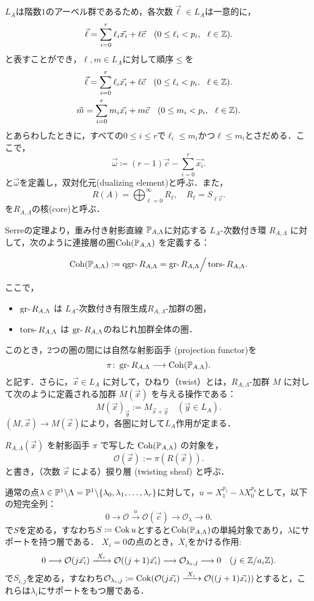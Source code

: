 $L_A$は階数$1$のアーベル群であるため，各次数$\vec{\ell}\in L_A$は一意的に，
\[\vec{\ell} = \sum_{i=0}^r \ell_i\vec{x_i} + \ell\vec{c}\quad (0\le \ell_i < p_i,\ \ \ell \in {\mathbb Z}).\]
と表すことができ，$\ell,m\in L_A$に対して順序$\le$を
\begin{gather*}
\vec{\ell} = \sum_{i=0}^r \ell_i\vec{x_i} + \ell\vec{c}\quad (0\le \ell_i < p_i,\ \ \ell \in \ZZ).\\
\vec{m} = \sum_{i=0}^r m_i\vec{x_i} + m\vec{c}\quad (0\le m_i < p_i,\ \ \ell \in \ZZ).
\end{gather*}
とあらわしたときに，すべての$0\le i\le r$で$\ell_i\le m_i$かつ$\ell\le m_i$とさだめる．ここで，
\[\vec{\omega} \coloneq (r-1)\vec{c} - \sum_{i=0}^r\vec{x_i}.\]
と$\vec{\omega}$を定義し，双対化元(dualizing element)と呼ぶ．また，
\[R(A)= \bigoplus_{\ell=0}^\infty R_{\ell},\quad R_\ell = S_{\ell\vec{c}}.\]
を$R_{A,\Lambda}$の核(core)と呼ぶ．

\begin{defn}\cite{GL87}
	Serreの定理より，重み付き射影直線 ${\mathbb P}_{A,\Lambda}$に対応する $L_A$-次数付き環 $R_{A,\Lambda}$ に対して，次のように連接層の圏$\operatorname{\mathrm{Coh}}({\mathbb P}_{A,\Lambda})$ を定義する：

\[
	\Coh(\PP_{A,\Lambda}) := \qgr R_{A,\Lambda} = \gr R_{A,\Lambda}\Big{/}\tors R_{A,\Lambda}.
\]

ここで，
\begin{itemize}
	\item $\gr R_{A,\Lambda}$ は $L_A$-次数付き有限生成$R_{A,\Lambda}$-加群の圏，
	\item $\tors R_{A,\Lambda}$ は $\gr R_{A,\Lambda}$のねじれ加群全体の圏．
\end{itemize}
このとき，2つの圏の間には自然な射影函手 (projection functor)を
\[ \pi\colon \gr R_{A,\Lambda} \longrightarrow \Coh(\PP_{A,\Lambda}) .\]
と記す．さらに，$\vec{x} \in L_A$ に対して，ひねり（twist）とは，$R_{A,\Lambda}$-加群 $M$ に対して次のように定義される加群 $M(\vec{x})$ を与える操作である：
\[
M(\vec{x})_{\vec{y}} := M_{\vec{x} + \vec{y}} \quad (\vec{y} \in L_A).
\]
$(M,\vec{x})\to M(\vec{x})$により，各圏に対して$L_A$作用が定まる．
\end{defn}
$R_{A,\Lambda}(\vec{x})$ を射影函手 $\pi$ で写した $\operatorname{\mathrm{Coh}}({\mathbb P}_{A,\Lambda})$ の対象を，
\[ \mathcal{O}(\vec{x}) := \pi(R(\vec{x})). \]
と書き，（次数 $\vec{x}$ による）捩り層 (twisting sheaf) と呼ぶ．

通常の点$\lambda\in{\mathbb P}^1\backslash\Lambda = {\mathbb P}^1\backslash\{\lambda_0,\lambda_1,\ldots, \lambda_r\}$に対して，$u = X_1^{p_1} - \lambda X_0^{p_0}$として，以下の短完全列：
\[0\longrightarrow \mathcal{O}\xrightarrow{\ u\ }\mathcal{O}(\vec{c})\longrightarrow \mathcal{O}_{\lambda}\longrightarrow 0.\]
で$S$を定める，すなわち$S\coloneq \operatorname{Cok} u $とすると$\operatorname{\mathrm{Coh}}({\mathbb P}_{A,\Lambda})$の単純対象であり，$\lambda$にサポートを持つ層である．
$X_i=0$の点のとき，$X_i$をかける作用:
\[0\longrightarrow \mathcal{O}(j\vec{x_i})\xrightarrow{\ X_i\ }\mathcal{O}((j+1)\vec{x_i})\longrightarrow \mathcal{O}_{\lambda_i,j}\longrightarrow 0\quad (j\in \ZZ/a_i\ZZ).\]
で$S_{i,j}$を定める，すなわち$\mathcal{O}_{\lambda_i,j}\coloneq \Cok (\mathcal{O}(j\vec{x_i})\xrightarrow{\ X_i\ }\mathcal{O}((j+1)\vec{x_i}))$とすると，これらは$\lambda_i$にサポートをもつ層である．


